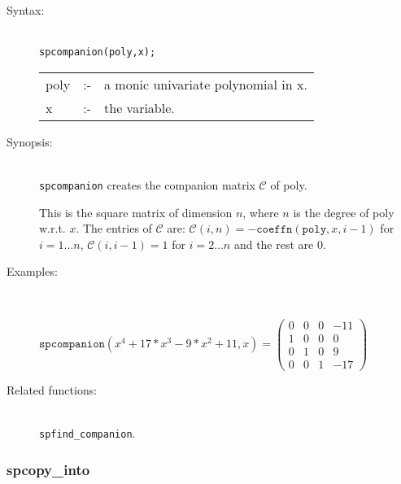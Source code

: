 \begin{description}
\item[Syntax:]\mbox{}\\
\texttt{spcompanion(poly,x);}\\[2mm]
\begin{tabular}{l l l}
poly &:-& a monic univariate polynomial in x. \\
x    &:-& the variable.
\end{tabular}

\item[Synopsis:]\mbox{}\\
                \texttt{spcompanion} creates the companion matrix $\mathcal{C}$
                of poly. 

This is the square matrix of dimension $n$, where $n$ is the degree of poly 
w.r.t. $x$.
The entries of $\mathcal{C}$ are: 
                $\mathcal{C}(i,n) = -\texttt{coeffn}(\texttt{poly},x,i-1)$ for $i = 1 
                \ldots n$, $\mathcal{C}(i,i-1) = 1$ for $i = 2 \ldots n$ and 
                the rest are $0$.

\item[Examples:]\mbox{}\\
\begin{flushleft}  
\begin{math}  
\texttt{spcompanion}(x^4+17*x^3-9*x^2+11,x) = 
\begin{pmatrix}
  0 & 0 & 0 & -11 \\ 1 & 0 & 0 & 0 \\ 0 & 1 & 0 & 9 \\ 0 & 0 & 1 & -17 
\end{pmatrix} 
\end{math}  
\end{flushleft}

\item[Related functions:]\mbox{}\\
\texttt{spfind\_companion}.
\end{description}

\subsubsection{spcopy\_into}
\label{sparse:spcopy_into}

